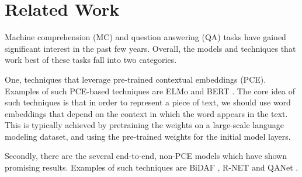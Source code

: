 \section{Related Work}
\label{sec:relatedwork}

Machine comprehension (MC) and question answering (QA) tasks have gained significant interest in the past few years. Overall, the models and techniques that work best of these tasks fall into two categories. 

One, techniques that leverage pre-trained contextual embeddings (PCE). Examples of such PCE-based techniques are ELMo \cite{peters2018deep} and BERT \cite{devlin2018bert}. The core idea of such techniques is that in order to represent a piece of text, we should use word embeddings that depend on the context in which the word appears in the text. This is typically achieved by pretraining the weights on a large-scale language modeling dataset, and using the pre-trained weights for the initial model layers.

Secondly, there are the several end-to-end, non-PCE models which have shown promising results. Examples of such techniques are BiDAF \cite{seo2016bidirectional}, R-NET \cite{wang2017gated} and QANet \cite{yu2018qanet}.  
